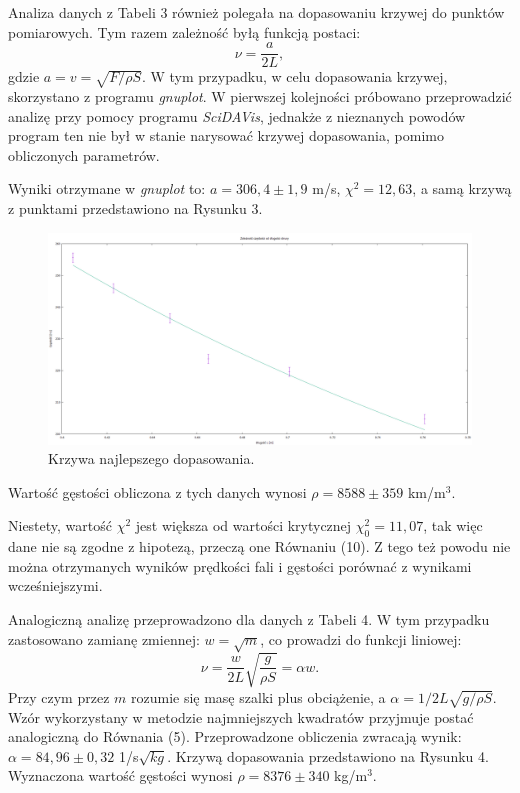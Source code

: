 \documentclass[10pt,a4paper]{article}
\begin{document}
Analiza danych z Tabeli 3 również polegała na dopasowaniu krzywej do punktów pomiarowych. 
Tym razem zależność byłą funkcją postaci:
\begin{equation}
\nu=\dfrac{a}{2L},
\end{equation}
gdzie $a=v=\sqrt{F/\rho S}$. W tym przypadku, w celu dopasowania krzywej, skorzystano z programu \textit{gnuplot}. W pierwszej kolejności próbowano przeprowadzić analizę przy pomocy programu \textit{SciDAVis}, jednakże z nieznanych powodów program ten nie był w stanie narysować krzywej dopasowania, pomimo obliczonych parametrów. 

Wyniki otrzymane w \textit{gnuplot} to: $a=306,4\pm1,9$ m/s, $\chi^2=12,63$, a samą krzywą z punktami przedstawiono na Rysunku 3.

\begin{figure}[h!]
\includegraphics[width=15cm]{rap10rys2} 
\centering
\caption{Krzywa najlepszego dopasowania.}
\end{figure}

Wartość gęstości obliczona z tych danych wynosi $\rho=8588\pm359$ km/m$^3$.

 Niestety, wartość $\chi^2$ jest większa od wartości krytycznej $\chi_{0}^2=11,07$, tak więc dane nie są zgodne z hipotezą, przeczą one Równaniu (10). Z tego też powodu nie można otrzymanych wyników prędkości fali i gęstości porównać z wynikami wcześniejszymi. 

Analogiczną analizę przeprowadzono dla danych z Tabeli 4. W tym przypadku zastosowano zamianę zmiennej: $w=\sqrt{m}$, co prowadzi do funkcji liniowej:
\begin{equation}
\nu=\dfrac{w}{2L}\sqrt{\dfrac{g}{\rho S}}=\alpha w.
\end{equation}
Przy czym przez $m$ rozumie się masę szalki plus obciążenie, a $\alpha=1/2L\sqrt{g/\rho S}$. Wzór wykorzystany w metodzie najmniejszych kwadratów przyjmuje postać analogiczną do Równania (5). Przeprowadzone obliczenia zwracają wynik: $\alpha=84,96\pm0,32$ 1/s$\sqrt{kg}$. Krzywą dopasowania przedstawiono na Rysunku 4. Wyznaczona wartość gęstości wynosi $\rho=8376\pm340$ kg/m$^3$.
\end{document}
